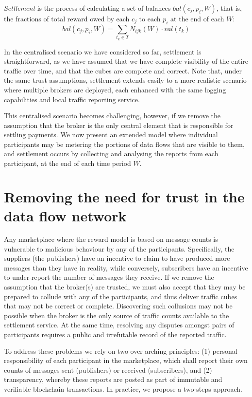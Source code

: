 \documentclass[conference]{IEEEtran}
\begin{document}
\textit{Settlement} is the process of calculating a set of balances $ \mathit{bal}(c_j, p_i, W) $, that is, the fractions of total reward owed by each $c_j$ to each $p_i$ at the end of each $W$:
\begin{equation}
\mathit{bal}(c_j, p_i, W) = \sum_{t_k \in T} N_{ijk}(W) \cdot \mathit{val}(t_k)
\label{eq:balance}
\end{equation}

In the centralised scenario we have considered so far, settlement is straightforward, as we have assumed that we have complete visibility of the entire traffic over time, and that the cubes are complete and correct.
Note that, under the same trust assumptions, settlement extends easily to a more realistic scenario where multiple brokers are deployed, each enhanced with the same logging capabilities and local traffic reporting service.

This centralised scenario becomes challenging, however, if we remove the assumption that the broker is the only central element that is responsible for settling payments.
We now present an extended model where individual participants may be metering the portions of data flows that are visible to them, and settlement occurs by collecting and analysing the reports from each participant, at the end of each time period $W$.

\section{Removing the need  for trust in the data flow network}  \label{sec:no-trust}

Any marketplace where the reward model is based on message counts is vulnerable to malicious behaviour by any of the participants. Specifically, the suppliers (the publishers) have an incentive to claim to have produced more messages than they have in reality, while conversely, subscribers have an incentive to under-report the number of messages they receive.
%
If we remove the assumption that the broker(s) are trusted, we must also accept that they may be prepared to collude with any of the participants, and thus deliver traffic cubes that may not be correct or complete.
Discovering such collusions may not be possible when the broker is the only source of traffic counts available to the settlement service.  At the same time, resolving any disputes amongst pairs of participants requires a public and irrefutable record of the reported traffic.

To address these problems we rely on two over-arching principles: (1) personal responsibility of each participant in the marketplace, which shall report their own counts of messages sent (publishers) or received (subscribers), and (2) transparency, whereby these reports are posted as part of immutable and verifiable blockchain transactions.
In practice, we propose a two-steps approach.
%
\end{document}
